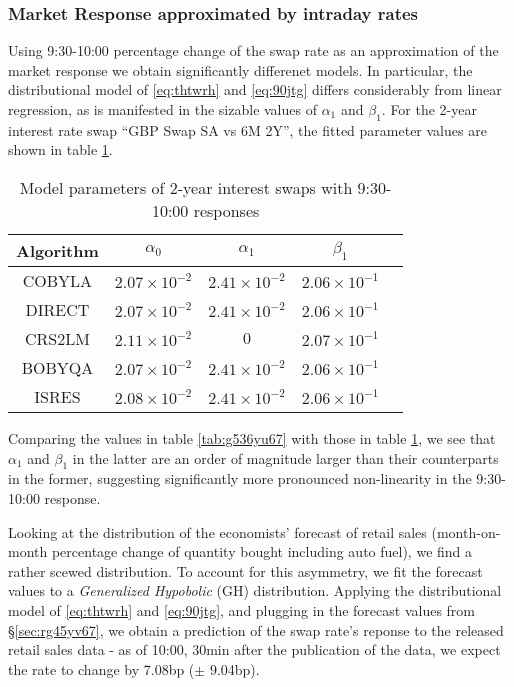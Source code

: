 \documentclass[a4paper,11pt,pdftex,twoside,titlepage]{article}
\begin{document}
\subsubsection{Market Response approximated by intraday rates}
\label{sec:9jfg4g}
Using 9:30-10:00 percentage change of the swap rate as an
approximation of the market response we obtain significantly
differenet models. In particular, the distributional model of
\eqref{eq:thtwrh} and \eqref{eq:90jtg} differs considerably from
linear regression, as is manifested in the sizable values of $\alpha_1$
and $\beta_1$. For the 2-year interest rate swap
``GBP Swap SA vs 6M 2Y'', the fitted parameter values are shown in
table \ref{tab:f45t5}.
\begin{table}[htb!]
  \centering
  \begin{tabular}{c|c|c|c|c}
    Algorithm & $\alpha_0$ & $\alpha_1$ & $\beta_1$ \\
    \hline
    COBYLA & $2.07 \times 10^{-2}$ & $2.41 \times 10^{-2}$ & $2.06 \times 10^{-1}$ \\
    DIRECT & $2.07 \times 10^{-2}$ & $2.41 \times 10^{-2}$ & $2.06 \times 10^{-1}$ \\
    CRS2LM & $2.11 \times 10^{-2}$ & $0$ & $2.07 \times 10^{-1}$ \\
    BOBYQA & $2.07 \times 10^{-2}$ & $2.41 \times 10^{-2}$ & $2.06 \times 10^{-1}$ \\
    ISRES & $2.08 \times 10^{-2}$ & $2.41 \times 10^{-2}$ & $2.06 \times 10^{-1}$ \\
    \hline
  \end{tabular}
  \caption{Model parameters of 2-year interest swaps with 9:30-10:00 responses}
  \label{tab:f45t5}
\end{table}
Comparing the values in table \ref{tab:g536yu67} with those in table
\ref{tab:f45t5}, we see that $\alpha_1$ and $\beta_1$ in the latter
are an order of magnitude larger than their counterparts in the
former, suggesting significantly more pronounced non-linearity in the
9:30-10:00 response.

Looking at the distribution of the economists' forecast of retail
sales (month-on-month percentage change of quantity bought including
auto fuel), we find a rather scewed distribution. To account for this
asymmetry, we fit the forecast values to a {\it Generalized Hypobolic}
(GH) distribution. Applying the distributional model of
\eqref{eq:thtwrh} and \eqref{eq:90jtg}, and plugging in the forecast
values from \S\ref{sec:rg45yv67}, we obtain a prediction of the
swap rate's reponse to the released retail sales data - as of 10:00,
30min after the publication of the data, we expect the rate to change
by 7.08bp ($\pm$ 9.04bp).
\end{document}
